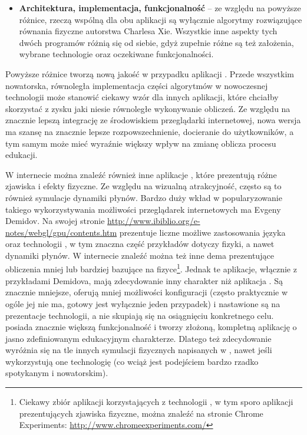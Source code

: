 \begin{itemize}
\item \textbf{Architektura, implementacja, funkcjonalność} -- ze względu na
powyższe różnice, rzeczą wspólną dla obu aplikacji są wyłącznie algorytmy
rozwiązujące równania fizyczne autorstwa Charlesa Xie. Wszystkie inne aspekty
tych dwóch programów różnią się od siebie, gdyż zupełnie różne są też założenia,
wybrane technologie oraz oczekiwane funkcjonalności.

\end{itemize}

Powyższe różnice tworzą nową jakość w przypadku aplikacji \en \js. Przede
wszystkim nowatorska, równoległa implementacja części algorytmów w nowoczesnej
technologii  może stanowić ciekawy wzór dla innych aplikacji, które
chciałby skorzystać z zysku jaki niesie równoległe wykonywanie obliczeń. Ze
względu na znacznie lepszą integrację ze środowiskiem przeglądarki internetowej,
nowa wersja ma szansę na znacznie lepsze rozpowszechnienie, docieranie do
użytkowników, a tym samym może mieć wyraźnie większy wpływ na zmianę oblicza
procesu edukacji.

W internecie można znaleźć również inne aplikacje \js, które prezentują różne
zjawiska i efekty fizyczne. Ze względu na wizualną atrakcyjność, często są to
również symulacje dynamiki płynów. Bardzo duży wkład w popularyzowanie takiego
wykorzystywania możliwości przeglądarek internetowych ma Evgeny Demidov. Na
swojej stronie \url{http://www.ibiblio.org/e-notes/webgl/gpu/contents.htm}
prezentuje liczne możliwe zastosowania języka \js oraz technologii , w
tym znaczna część przykładów dotyczy fizyki, a nawet dynamiki płynów. W
internecie znaleźć można też inne dema prezentujące obliczenia mniej lub
bardziej bazujące na fizyce\footnote{Ciekawy zbiór aplikacji korzystających z
technologii , w tym sporo aplikacji prezentujących zjawiska fizyczne,
można znaleźć na stronie Chrome Experiments:
\url{http://www.chromeexperiments.com/}}. Jednak te aplikacje, włącznie z
przykładami Demidova, mają zdecydowanie inny charakter niż aplikacja \en. Są
znacznie mniejsze, oferują mniej możliwości konfiguracji (często praktycznie w
ogóle jej nie ma, gotowy jest wyłącznie jeden przypadek) i nastawione są na
prezentacje technologii, a nie skupiają się na osiągnięciu konkretnego celu. \en
posiada znacznie większą funkcjonalność i tworzy złożoną, kompletną aplikację o
jasno zdefiniowanym edukacyjnym charakterze. Dlatego też zdecydowanie wyróżnia
się na tle innych symulacji fizycznych napisanych w \js, nawet jeśli
wykorzystują one technologię  (co wciąż jest podejściem bardzo rzadko
spotykanym i nowatorskim).
